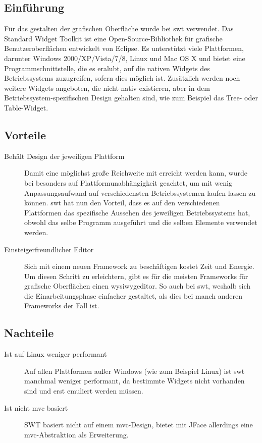 \subsection{Einführung}
Für das gestalten der grafischen Oberfläche wurde bei \sblit \acrshort{swt} verwendet.
Das Standard Widget Toolkit ist eine Open-Source-Bibliothek für grafische
Benutzeroberflächen entwickelt von Eclipse. Es unterstützt viele Plattformen,
darunter Windows 2000/XP/Vista/7/8, Linux und Mac OS X und bietet eine
Programmschnittstelle, die es eralubt, auf die nativen Widgets des
Betriebssystems zuzugreifen, sofern dies möglich ist. Zusätzlich werden noch
weitere Widgets angeboten, die nicht nativ existieren, aber in dem
Betriebssystem-spezifischen Design gehalten sind, wie zum Beispiel das Tree-
oder Table-Widget.

\subsection{Vorteile}
\begin{description}
	\item[{Behält Design der jeweiligen Plattform}]
    Damit eine möglichst große Reichweite mit \sblit erreicht werden kann, wurde bei
    besonders auf Plattformunabhängigkeit geachtet, um \sblit mit wenig
    Anpassungsaufwand auf verschiedensten Betriebssystemen laufen lassen zu können.
		\acrshort{swt} hat nun den Vorteil, dass es auf den verschiedenen Plattformen das
    spezifische Aussehen des jeweiligen Betriebssystems hat, obwohl das selbe
    Programm ausgeführt und die selben Elemente verwendet werden.

	\item[{Einsteigerfreundlicher Editor}]
    Sich mit einem neuen Framework zu beschäftigen kostet Zeit und Energie. Um
    diesen Schritt zu erleichtern, gibt es für die meisten Frameworks für grafische
    Oberflächen einen \gls{wysiwygeditor}. So auch bei \acrshort{swt}, weshalb
    sich die Einarbeitungsphase einfacher gestaltet, als dies bei manch anderen Frameworks
    der Fall ist.
\end{description}

\subsection{Nachteile}
\begin{description}
	\item[{Ist auf Linux weniger performant}]
    Auf allen Plattformen außer Windows (wie zum Beispiel Linux) ist \acrshort{swt} manchmal
    weniger performant, da bestimmte Widgets nicht vorhanden sind und erst emuliert werden müssen.

	\item[{Ist nicht \acrshort{mvc} basiert}]
    SWT basiert nicht auf einem \acrshort{mvc}-Design, bietet mit JFace allerdings eine
    \acrshort{mvc}-Abstraktion als Erweiterung.
\end{description}

